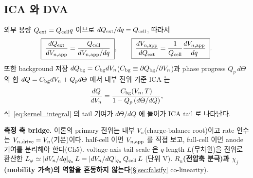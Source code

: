 \subsection{ICA 와 DVA}
외부 용량 $Q_{\mathrm{ext}}=Q_{\mathrm{cell}} q$ 이므로 $dQ_{\mathrm{ext}}/dq=Q_{\mathrm{cell}}$, 따라서
\begin{equation}
\boxed{\;\frac{dQ_{\mathrm{ext}}}{dV_{n,\mathrm{app}}}=\frac{Q_{\mathrm{cell}}}{dV_{n,\mathrm{app}}/dq}\;},\qquad
\boxed{\;\frac{dV_{n,\mathrm{app}}}{dQ_{\mathrm{ext}}}=\frac{1}{Q_{\mathrm{cell}}}\frac{dV_{n,\mathrm{app}}}{dq}\;}.
\label{eq:icadva}
\end{equation}
또한 background 저장 $dQ_{\mathrm{bg}}=C_{\mathrm{bg}} dV_n$($C_{\mathrm{bg}}\equiv\partial Q_{\mathrm{bg}}/\partial V_n$)과 phase progress
$Q_p\,d\Theta$ 의 합 $dQ=C_{\mathrm{bg}} dV_n+Q_p d\Theta$ 에서 내부 전위 기준 ICA 는
\begin{equation}
\frac{dQ}{dV_n}=\frac{C_{\mathrm{bg}}(V_n,T)}{1-Q_p\,(d\Theta/dQ)},
\label{eq:ica_internal}
\end{equation}
식~\eqref{eq:kernel_integral} 의 tail 기여가 $d\Theta/dQ$ 에 들어가 ICA tail 로 나타난다.

\textbf{측정 축 bridge.} 이론의 primary 전위는 내부 $V_n$(charge-balance root)이고 rate 인수는
$V_{n,\mathrm{drive}}=V_n$(기본)이다. half-cell 이면 $V_{n,\mathrm{app}}$ 를 직접 보고, full-cell 이면 anode 기여를 분리해야
한다(Ch5). voltage-axis tail scale 은 $q$-length $L$(무차원)을 전위로 환산한
$L_\varphi\simeq|dV_n/dq|_{q_a}\,L=|dV_n/dQ|_{q_a}\,Q_{\mathrm{cell}}\,L$ (단위 V). \textbf{$R_n$(전압축 분극)과
$\chi_j$(mobility 가속)의 역할을 혼동하지 않는다}(\S\ref{sec:falsify} co-linearity).

